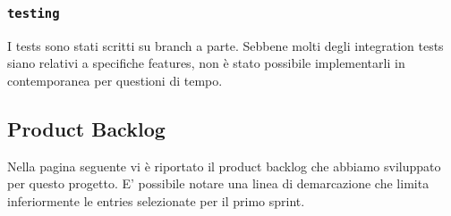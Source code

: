 \documentclass{article}
\begin{document}
\subsubsection{\texttt{testing}}
I tests sono stati scritti su branch a parte. Sebbene molti degli integration tests siano relativi a specifiche features, non è stato possibile implementarli in contemporanea per questioni di tempo.

\clearpage

\subsection{Product Backlog}
\label{tab:product-backlog}
Nella pagina seguente vi è riportato il product backlog che abbiamo sviluppato per questo progetto. E' possibile notare una linea di demarcazione che limita inferiormente le entries selezionate per il primo sprint.
\end{document}
